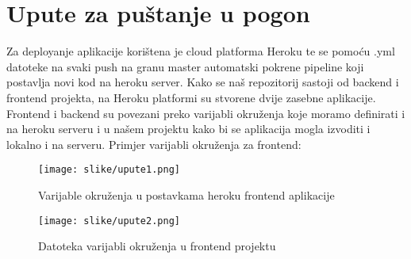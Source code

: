 			\eject 
		
		\section{Upute za puštanje u pogon}
		
%		
%			
%			

Za deployanje aplikacije korištena je cloud platforma Heroku te se pomoću .yml datoteke na svaki push na granu master automatski pokrene pipeline koji postavlja novi kod na heroku server. Kako se naš repozitorij sastoji od backend i frontend projekta, na Heroku platformi su stvorene dvije zasebne aplikacije. Frontend i backend su povezani preko varijabli okruženja koje moramo definirati i na heroku serveru i u našem projektu kako bi se aplikacija mogla izvoditi i lokalno i na serveru. Primjer varijabli okruženja za frontend:

				\begin{figure}[H]
					\texttt{[image: slike/upute1.png]}
					\centering
					\caption{Varijable okruženja u postavkama heroku frontend aplikacije}
					\label{fig:upute1}
				\end{figure}
				
				\begin{figure}[H]
					\texttt{[image: slike/upute2.png]}
					\centering
					\caption{Datoteka varijabli okruženja u frontend projektu}
					\label{fig:upute2}
				\end{figure}
				

